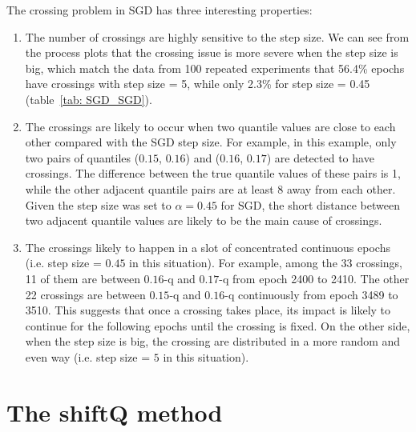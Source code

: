The crossing problem in SGD has three interesting properties:
\begin{enumerate}

    \item The number of crossings are highly sensitive to the step size. We can see from the process plots that the crossing issue is more severe when the step size is big, which match the data from 100 repeated experiments that 56.4\% epochs have crossings with step size = 5, while only 2.3\% for step size = 0.45 (table~\ref{tab: SGD_SGD}).

    \item The crossings are likely to occur when two quantile values are close to each other compared with the SGD step size. For example, in this example, only two pairs of quantiles ($0.15$, $0.16$) and ($0.16$, $0.17$) are detected to have crossings. The difference between the true quantile values of these pairs is 1, while the other adjacent quantile pairs are at least 8 away from each other. Given the step size was set to $\alpha = 0.45$ for SGD, the short distance between two adjacent quantile values are likely to be the main cause of crossings.
    
    \item The crossings likely to happen in a slot of concentrated continuous epochs (i.e. step size = $0.45$ in this situation). For example, among the 33 crossings, 11 of them are between $0.16$-q and $0.17$-q from epoch 2400 to 2410. The other 22 crossings are between $0.15$-q and $0.16$-q continuously from epoch 3489 to 3510. This suggests that once a crossing takes place, its impact is likely to continue for the following epochs until the crossing is fixed. On the other side, when the step size is big, the crossing are distributed in a more random and even way (i.e. step size = $5$ in this situation).
    
\end{enumerate}

\section{The shiftQ method}
\label{sec: multi_shiftQ}

